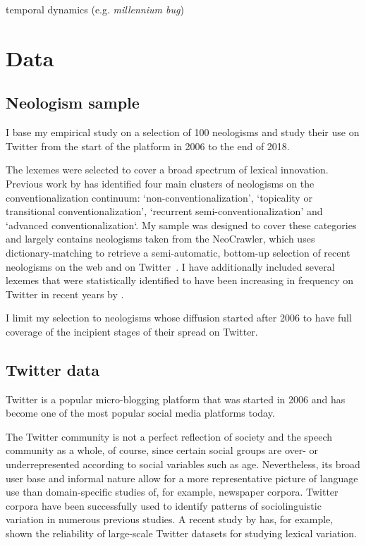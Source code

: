 \documentclass[
  a4paper,
  abstract=on,
  captions=tableabove
  ]{scrartcl}
\begin{document}
  temporal dynamics (e.g. \emph{millennium bug})



\section{Data}
  \label{sec:data}
  \subsection{Neologism sample}
    \label{subsec:neo-sample}

  I base my empirical study on a selection of 100 neologisms and study their use on Twitter from the start of the platform in 2006 to the end of 2018.

  The lexemes were selected to cover a broad spectrum of lexical innovation. Previous work by \textcite[115--147]{Kerremans2015WebNew} has identified four main clusters of neologisms on the conventionalization continuum: `non-conventionalization', `topicality or transitional conventionalization', `recurrent semi-conventionalization' and `advanced conventionalization`. My sample was designed to cover these categories and largely contains neologisms taken from the NeoCrawler, which uses dictionary-matching to retrieve a semi-automatic, bottom-up selection of recent neologisms on the web and on Twitter~\parencite{Kerremans2019UsingDatamining}. I have additionally included several lexemes that were statistically identified to have been increasing in frequency on Twitter in recent years by \textcite{Grieve2016AnalyzingLexical}.

  I limit my selection to neologisms whose diffusion started after 2006 to have full coverage of the incipient stages of their spread on Twitter.

  \subsection{Twitter data}
    \label{subsec:twitter-data}

    Twitter is a popular micro-blogging platform that was started in 2006 and has become one of the most popular social media platforms today.

    The Twitter community is not a perfect reflection of society and the speech community as a whole, of course, since certain social groups are over- or underrepresented according to social variables such as age. Nevertheless, its broad user base and informal nature allow for a more representative picture of language use than domain-specific studies of, for example, newspaper corpora. Twitter corpora have been successfully used to identify patterns of sociolinguistic variation in numerous previous studies. A recent study by \textcite{Grieve2019MappingLexical} has, for example, shown the reliability of large-scale Twitter datasets for studying lexical variation.
\end{document}
